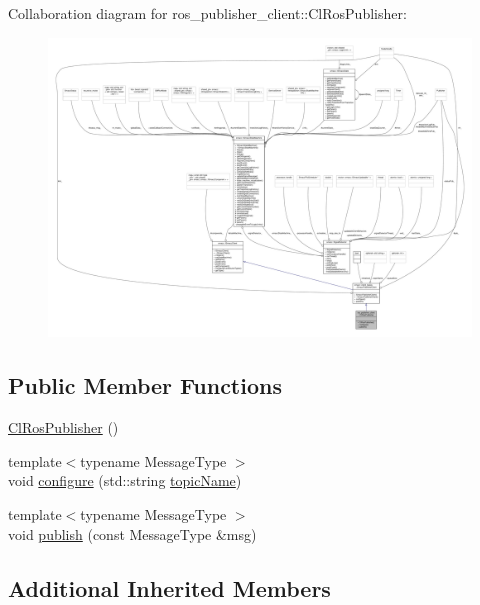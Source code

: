 Collaboration diagram for ros\+\_\+publisher\+\_\+client\+:\+:Cl\+Ros\+Publisher\+:\nopagebreak
\begin{figure}[H]
\begin{center}
\leavevmode
\includegraphics[width=350pt]{classros__publisher__client_1_1ClRosPublisher__coll__graph}
\end{center}
\end{figure}
\subsection*{Public Member Functions}
\begin{DoxyCompactItemize}
\item 
\hyperlink{classros__publisher__client_1_1ClRosPublisher_a9a5c4a6c97a6fcab30827521891f222f}{Cl\+Ros\+Publisher} ()
\item 
{\footnotesize template$<$typename Message\+Type $>$ }\\void \hyperlink{classros__publisher__client_1_1ClRosPublisher_aae4ef0ad45fd4f4e24659b9386af80a3}{configure} (std\+::string \hyperlink{classsmacc_1_1client__bases_1_1SmaccPublisherClient_a8b8d98aef9b3b3a441005d2cb17b4fcc}{topic\+Name})
\item 
{\footnotesize template$<$typename Message\+Type $>$ }\\void \hyperlink{classros__publisher__client_1_1ClRosPublisher_a9e62a3581a730cd2e287e560d04d151b}{publish} (const Message\+Type \&msg)
\end{DoxyCompactItemize}
\subsection*{Additional Inherited Members}


